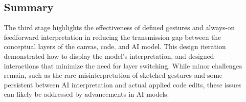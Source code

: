 \subsection{Summary}
The third stage highlights the effectiveness of defined gestures and always-on feedforward interpretation in reducing the transmission gap between the conceptual layers of the canvas, code, and AI model. This design iteration demonstrated how to display the model's interpretation, and designed interactions that minimize the need for layer switching.
While minor challenges remain, such as the rare misinterpretation of sketched gestures and some persistent between AI interpretation and actual applied code edits, these issues can likely be addressed by advancements in AI models.

